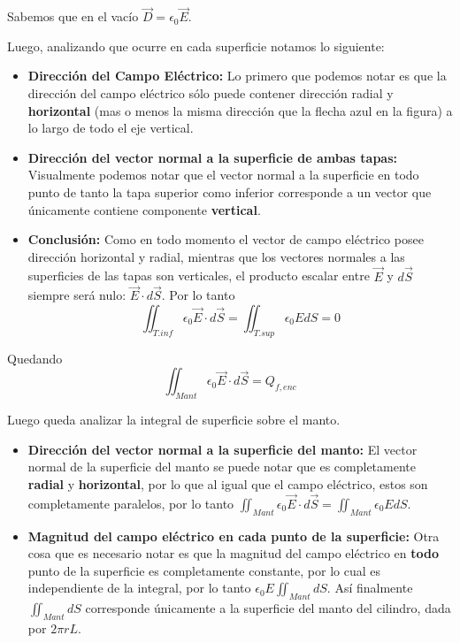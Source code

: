 \documentclass[11pt]{article}
\begin{document}
\begin{solucion}
    Sabemos que en el vacío $\vec{D}=\epsilon_0\vec{E}$.

    Luego, analizando que ocurre en cada superficie notamos lo siguiente:

    \begin{itemize}
        \item \textbf{Dirección del Campo Eléctrico:} Lo primero que podemos notar es que la dirección del campo eléctrico sólo puede contener dirección radial y \textbf{horizontal} (mas o menos la misma dirección que la flecha azul en la figura) a lo largo de todo el eje vertical.
        \item \textbf{Dirección del vector normal a la superficie de ambas tapas:} Visualmente podemos notar que el vector normal a la superficie en todo punto de tanto la tapa superior como inferior corresponde a un vector que únicamente contiene componente \textbf{vertical}.
        \item \textbf{Conclusión:} Como en todo momento el vector de campo eléctrico posee dirección horizontal y radial, mientras que los vectores normales a las superficies de las tapas son verticales, el producto escalar entre $\vec{E}$ y $d\vec{S}$ siempre será nulo: $\vec{E}\cdot d\vec{S}$. Por lo tanto
              \begin{equation}
                  \iint_{T.inf}\epsilon_0\vec{E}\cdot d\vec{S} = \iint_{T.sup}\epsilon_0EdS = 0
              \end{equation}
    \end{itemize}

    Quedando
    \begin{equation}
        \iint_{Mant} \epsilon_0 \vec{E} \cdot d\vec{S} = Q_{f, enc} \label{guia3:p2:eq1}
    \end{equation}

    Luego queda analizar la integral de superficie sobre el manto.

    \begin{itemize}
        \item \textbf{Dirección del vector normal a la superficie del manto:} El vector normal de la superficie del manto se puede notar que es completamente \textbf{radial} y \textbf{horizontal}, por lo que al igual que el campo eléctrico, estos son completamente paralelos, por lo tanto $\iint_{Mant} \epsilon_0\vec{E}\cdot d\vec{S} = \iint_{Mant} \epsilon_0EdS$.
        \item \textbf{Magnitud del campo eléctrico en cada punto de la superficie:} Otra cosa que es necesario notar es que la magnitud del campo eléctrico en \textbf{todo} punto de la superficie es completamente constante, por lo cual es independiente de la integral, por lo tanto $\epsilon_0E \iint_{Mant}dS$. Así finalmente $\iint_{Mant}dS$ corresponde únicamente a la superficie del manto del cilindro, dada por $2\pi rL$.
    \end{itemize}


\end{solucion}
\end{document}

